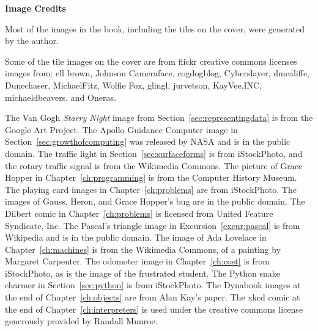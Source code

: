 \documentclass[10pt]{book}
\begin{document}
\setcounter{tocdepth}{3}
\renewcommand{\cftpartpresnum}{\large\bfseries \partname\ }
\renewcommand{\cftpartaftersnum}{:}

\cleardoublepage
\pagestyle{plain}
\tableofcontents



\renewcommand{\cftloftitlefont}{\large\bfseries}
\setlength{\cftafterloftitleskip}{0pt}
\setlength{\cftfigindent}{0cm}
\setlength{\cftexplorationindent}{0cm}

\listofexploration
\listoffigures
\clearpage
\vspace*{3.5in}

{\bf Image Credits}

Most of the images in the book, including the tiles on the cover, were generated by the author.  

Some of the tile images on the cover are from flickr creative commons licenses images from: 
ell brown,
Johnson Cameraface,
cogdogblog,
Cyberslayer,
dme\-al\-if\-fe,
Dunechaser,
MichaelFitz, 
Wolfie Fox,  
glingl,
jurvetson,
KayVee.INC, 
michaeldbeavers,
and Oneras.

The Van Gogh \emph{Starry Night} image from Section~\ref{sec:representingdata} is from the Google Art Project.  The Apollo Guidance Computer image in Section~\ref{sec:growthofcomputing} was released by NASA and is in the public domain.  The traffic light in Section~\ref{sec:surfaceforms} is from iStockPhoto, and the rotary traffic signal is from the Wikimedia Commons.   The picture of Grace Hopper in Chapter~\ref{ch:programming} is from the Computer History Museum.  The playing card images in Chapter~\ref{ch:problems} are from iStockPhoto.  The images of Gauss, Heron, and Grace Hopper's bug are in the public domain.  The Dilbert comic in Chapter~\ref{ch:problems} is licensed from United Feature Syndicate, Inc.  The Pascal's triangle image in Excursion~\ref{excur:pascal} is from Wikipedia and is in the public domain.  The image of Ada Lovelace in Chapter~\ref{ch:machines} is from the Wikimedia Commons, of a painting by Margaret Carpenter.  The odomoter image in Chapter~\ref{ch:cost} is from iStockPhoto, as is the image of the frustrated student.  The Python snake charmer in Section~\ref{sec:python} is from iStockPhoto.  The Dynabook images at the end of Chapter~\ref{ch:objects} are from Alan Kay's paper.  The xkcd comic at the end of Chapter~\ref{ch:interpreters} is used under the creative commons license generously provided by Randall Munroe. 
\end{document}
